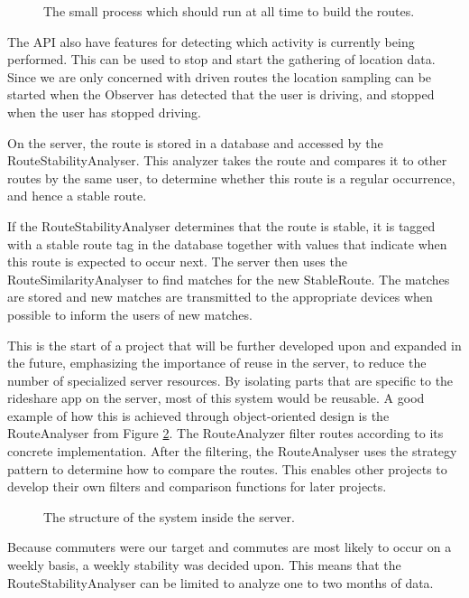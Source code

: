 \begin{figure}[h]
	\centering
	
	\caption{The small process which should run at all time to build the routes.}
	\label{fig:classDiagramSprint1Observer}
\end{figure}

The API also have features for detecting which activity is currently being performed.
This can be used to stop and start the gathering of location data.
Since we are only concerned with driven routes the location sampling can be started when the Observer has detected that the user is driving, and stopped when the user has stopped driving.

On the server, the route is stored in a database and accessed by the RouteStabilityAnalyser.
This analyzer takes the route and compares it to other routes by the same user, to determine whether this route is a regular occurrence, and hence a stable route.

If the RouteStabilityAnalyser determines that the route is stable, it is tagged with a stable route tag in the database together with values that indicate when this route is expected to occur next.
The server then uses the RouteSimilarityAnalyser to find matches for the new StableRoute.
The matches are stored and new matches are transmitted to the appropriate devices when possible to inform the users of new matches.

%	

This is the start of a project that will be further developed upon and expanded in the future, emphasizing the importance of reuse in the server, to reduce the number of specialized server resources.
By isolating parts that are specific to the rideshare app on the server, most of this system would be reusable.
A good example of how this is achieved through object-oriented design is the RouteAnalyser from Figure \ref{fig:classDiagramSprint1Server}.
The RouteAnalyzer filter routes according to its concrete implementation.
After the filtering, the RouteAnalyser uses the strategy pattern to determine how to compare the routes.
This enables other projects to develop their own filters and comparison functions for later projects.

\begin{figure}[h!]
	\centering
	
	\caption{The structure of the system inside the server.}
	\label{fig:classDiagramSprint1Server}
\end{figure}

Because commuters were our target and commutes are most likely to occur on a weekly basis, a weekly stability was decided upon.
This means that the RouteStabilityAnalyser can be limited to analyze one to two months of data.